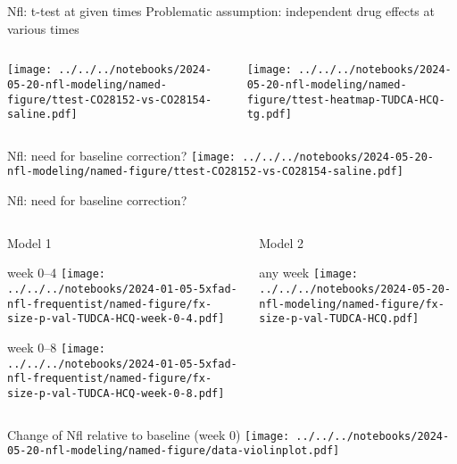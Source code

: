 \documentclass[aspectratio=169]{beamer}
\begin{document}
\begin{frame}{Nfl: t-test at given times}
  {Problematic assumption: independent drug effects at various times}
\begin{columns}[t]
\begin{column}{0.5\textwidth}

  \texttt{[image: ../../../notebooks/2024-05-20-nfl-modeling/named-figure/ttest-CO28152-vs-CO28154-saline.pdf]}
\end{column}

\begin{column}{0.5\textwidth}

  \texttt{[image: ../../../notebooks/2024-05-20-nfl-modeling/named-figure/ttest-heatmap-TUDCA-HCQ-tg.pdf]}
\end{column}
\end{columns}
\end{frame}


\begin{frame}{Nfl: need for baseline correction?}
  \texttt{[image: ../../../notebooks/2024-05-20-nfl-modeling/named-figure/ttest-CO28152-vs-CO28154-saline.pdf]}
\end{frame}


\begin{frame}{Nfl: need for baseline correction?}
\begin{columns}[t]
\begin{column}{0.5\textwidth}
  \begin{center}
    Model 1
  \end{center}

  week 0--4
  \texttt{[image: ../../../notebooks/2024-01-05-5xfad-nfl-frequentist/named-figure/fx-size-p-val-TUDCA-HCQ-week-0-4.pdf]}

  week 0--8
  \texttt{[image: ../../../notebooks/2024-01-05-5xfad-nfl-frequentist/named-figure/fx-size-p-val-TUDCA-HCQ-week-0-8.pdf]}
\end{column}

\begin{column}{0.5\textwidth}
  \begin{center}
    Model 2
  \end{center}

  any week
  \texttt{[image: ../../../notebooks/2024-05-20-nfl-modeling/named-figure/fx-size-p-val-TUDCA-HCQ.pdf]}
\end{column}
\end{columns}
\end{frame}

\begin{frame}{Change of Nfl relative to baseline (week 0)}
  \texttt{[image: ../../../notebooks/2024-05-20-nfl-modeling/named-figure/data-violinplot.pdf]}
\end{frame}
\end{document}
